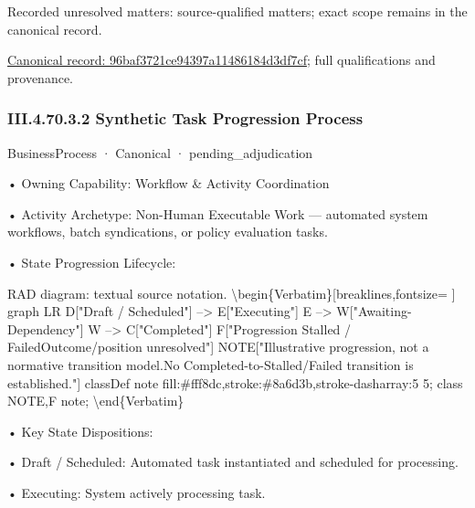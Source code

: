 {\small Recorded unresolved matters: source-qualified matters; exact scope remains in the canonical record.}\par
{\footnotesize \href{../../../../continuum/business/business-process/96baf3721ce94397a11486184d3df7cf.md}{Canonical record: 96baf3721ce94397a11486184d3df7cf}; full qualifications and provenance.}\par
\subsubsection*{III.4.70.3.2 Synthetic Task Progression Process}
\label{navigation:III.4.70.3.2}

\label{element:618acdb38fc74952ab360fdde4f7d865}
{\small BusinessProcess · Canonical · pending\_adjudication}\par

•
Owning Capability: Workflow \& Activity Coordination



•
Activity Archetype: Non-Human Executable Work — automated system workflows, batch syndications, or policy evaluation tasks.



•
State Progression Lifecycle:



RAD diagram: textual source notation.
\textbackslash{}begin\{Verbatim\}[breaklines,fontsize=
]
graph LR
    D["Draft / Scheduled"] --> E["Executing"]
    E --> W["Awaiting-Dependency"]
    W --> C["Completed"]
    F["Progression Stalled / Failed\newline{}Outcome/position unresolved"]
    NOTE["Illustrative progression, not a normative transition model.\newline{}No Completed-to-Stalled/Failed transition is established."]
    classDef note fill:\#fff8dc,stroke:\#8a6d3b,stroke-dasharray:5 5;
    class NOTE,F note;
\textbackslash{}end\{Verbatim\}



•
Key State Dispositions:



•
Draft / Scheduled: Automated task instantiated and scheduled for processing.



•
Executing: System actively processing task.



